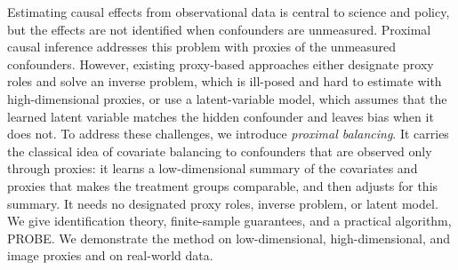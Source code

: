 Estimating causal effects from observational data is central to science and policy, but the effects are not identified when confounders are unmeasured. Proximal causal inference addresses this problem with proxies of the unmeasured confounders. However, existing proxy-based approaches either designate proxy roles and solve an inverse problem, which is ill-posed and hard to estimate with high-dimensional proxies, or use a latent-variable model, which assumes that the learned latent variable matches the hidden confounder and leaves bias when it does not. To address these challenges, we introduce \emph{proximal balancing}. It carries the classical idea of covariate balancing to confounders that are observed only through proxies: it learns a low-dimensional summary of the covariates and proxies that makes the treatment groups comparable, and then adjusts for this summary. It needs no designated proxy roles, inverse problem, or latent model. We give identification theory, finite-sample guarantees, and a practical algorithm, PROBE. We demonstrate the method on low-dimensional, high-dimensional, and image proxies and on real-world data.
